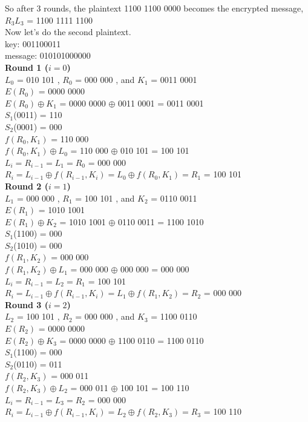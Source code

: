 \documentclass[12pt,letterpaper,final]{report}
\begin{document}
So after 3 rounds, the plaintext 1100 1100 0000 becomes the encrypted message, $R_3L_3$ = 1100 1111 1100 \\

Now let's do the second plaintext. \\ 

key: 001100011 \\
message: 010101000000 \\

\textbf{Round 1 ($i = 0$) } \\

$L_0$ = 010 101 ,
$R_0$ = 000 000 , and 
$K_1$ = 0011 0001 \\
$E(R_0)$ = 0000 0000 \\
$E(R_0)  \oplus K_1 $  = 0000 0000 $ \oplus $ 0011 0001 = 0011 0001 \\
$S_1$(0011) = 110 \\
$S_2$(0001) = 000 \\
$f(R_0,K_1)$ = 110 000 \\
$f(R_0,K_1)  \oplus  L_0$ = 110 000 $ \oplus $ 010 101 = 100 101 \\
$L_i = R_{i-1} = L_1 = R_0$ = 000 000\\
$R_i = L_{i-1} \oplus f(R_{i-1},K_i) = L_0 \oplus f(R_0,K_1) = R_1$ = 100 101 \\


\textbf{Round 2 ($i = 1$) } \\

$L_1$ = 000 000 ,
$R_1$ = 100 101 , and 
$K_2$ = 0110 0011 \\
$E(R_1)$ = 1010 1001 \\
$E(R_1)  \oplus K_2 $  = 1010 1001 $ \oplus $ 0110 0011 = 1100 1010 \\
$S_1$(1100) = 000 \\
$S_2$(1010) = 000 \\
$f(R_1,K_2)$ = 000 000 \\
$f(R_1,K_2)  \oplus  L_1$ = 000 000 $ \oplus $ 000 000 = 000 000 \\
$L_i = R_{i-1} = L_2 = R_1$ = 100 101\\
$R_i = L_{i-1} \oplus f(R_{i-1},K_i) = L_1 \oplus f(R_1,K_2) = R_2$ = 000 000 \\


\textbf{Round 3 ($i = 2$) } \\

$L_2$ = 100 101 ,
$R_2$ = 000 000 , and 
$K_3$ =  1100 0110 \\
$E(R_2)$ = 0000 0000 \\
$E(R_2)  \oplus K_3 $  = 0000 0000 $ \oplus $ 1100 0110 = 1100 0110 \\
$S_1$(1100) = 000 \\
$S_2$(0110) = 011 \\
$f(R_2,K_3)$ = 000 011 \\
$f(R_2,K_3)  \oplus  L_2$ = 000 011 $ \oplus $ 100 101 = 100 110 \\
$L_i = R_{i-1} = L_3 = R_2$ = 000 000 \\
$R_i = L_{i-1} \oplus f(R_{i-1},K_i) = L_2 \oplus f(R_2,K_3) = R_3$ = 100 110 \\
\end{document}
